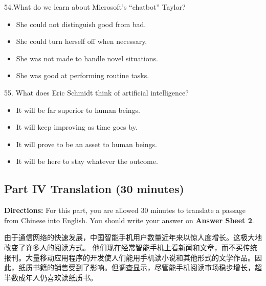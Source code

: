 \documentclass[UTF8,11pt]{ctexart}
\begin{document}
54.What do we learn about Microsoft’s “chatbot” Taylor?


\begin{itemize}[leftmargin=2em,itemsep=.2em,topsep=.4em]\item[A.] She could not distinguish good from bad.
\item[B.] She could turn herself off when necessary.
\item[C.] She was not made to handle novel situations.
\item[D.] She was good at performing routine tasks.
\end{itemize}

55. What does Eric Schmidt think of artificial intelligence?


\begin{itemize}[leftmargin=2em,itemsep=.2em,topsep=.4em]\item[A.] It will be far superior to human beings.
\item[B.] It will keep improving as time goes by.
\item[C.] It will prove to be an asset to human beings.
\item[D.] It will be here to stay whatever the outcome.
\end{itemize}

\subsection*{\textbf{Part} IV \textbf{Translation} \textbf{(30 minutes)}}


\textbf{Directions:} For this part, you are allowed 30 minutes to translate a passage from Chinese into English. You should write your answer on\textbf{ Answer Sheet 2}.


由于通信网络的快速发展，中国智能手机用户数量近年来以惊人度增长。这极大地改变了许多人的阅读方式。 他们现在经常智能手机上看新闻和文章，而不买传统报刊。大量移动应用程序的开发使人们能用手机读小说和其他形式的文学作品。因此，纸质书籍的销售受到了影响。但调查显示，尽管能手机阅读市场稳步增长，超半数成年人仍喜欢读纸质书。
\end{document}
